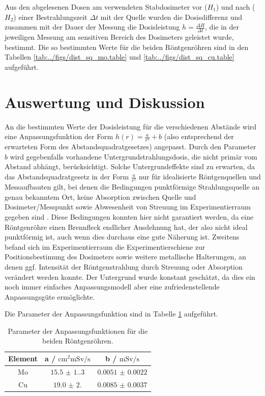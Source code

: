 Aus den abgelesenen Dosen am verwendeten Stabdosimeter vor ($H_1$) und nach ($H_2$) einer Bestrahlungszeit $\Delta t$ mit der Quelle wurden die Dosisdifferenz und zusammen mit der Dauer der Messung die Dosisleistung $h=\frac{\Delta H}{\Delta t}$, die in der jeweiligen Messung am sensitiven Bereich des Dosimeters geleistet wurde, bestimmt. Die so bestimmten Werte für die beiden Röntgenröhren sind in den Tabellen \ref{tab:../figs/dist_sq_mo.table} und \ref{tab:../figs/dist_sq_cu.table} aufgeführt.


\section{Auswertung und Diskussion}

An die bestimmten Werte der Dosisleistung für die verschiedenen Abstände wird eine Anpassungsfunktion der Form $h(r)=\frac{a}{r^2}+b$ (also entsprechend der erwarteten Form des Abstandsquadratgesetzes) angepasst. Durch den Parameter $b$ wird gegebenfalls vorhandene Untergrundstrahlungsdosis, die nicht primär vom Abstand abhängt, berücksichtigt. Solche Untergrundeffekte sind zu erwarten, da das Abstandsquadratgesetz in der Form $\frac{a}{r^2}$ nur für idealisierte Röntgenquellen und Messaufbauten gilt, bei denen die Bedingungen punktförmige Strahlungsquelle an genau bekanntem Ort, keine Absorption zwischen Quelle und Dosimeter/Messpunkt sowie Abwesenheit von Streuung im Experimentierraum gegeben sind \cite[350]{dosimetriekrieger}. Diese Bedingungen konnten hier nicht garantiert werden, da eine Röntgenröhre einen Brennfleck endlicher Ausdehnung hat, der also nicht ideal punktförmig ist, auch wenn dies durchaus eine gute Näherung ist. Zweitens befand sich im Experimentierraum die Experimentierschiene zur Positionsbestimung des Dosimeters sowie weitere metallische Halterungen, an denen ggf. Intensität der Röntgenstrahlung durch Streuung oder Absorption verändert werden konnte. Der Untergrund wurde konstant geschätzt, da dies ein noch immer einfaches Anpassungsmodell aber eine zufriedenstellende Anpassungsgüte ermöglichte.

Die Parameter der Anpassungsfunktion sind in Tabelle \ref{tab:dist_sq_werte} aufgeführt.

\begin{table}[h]
	    \centering
	    \begin{tabular}{|c|c|c|} \hline
		Element & a / $\unit{\centi\meter^2\milli\sievert\per\second}$ & b / $\unit{\milli\sievert\per\s}$ \\ \hline
		Mo & $\num{15.5(1.3)}$ & $\num{0.0051(22)}$ \\
		Cu & $\num{19.0(2.0)}$ & $\num{0.0085(37)}$ \\ \hline
	    \end{tabular}
	    \caption{Parameter der Anpassungsfunktionen für die beiden Röntgenröhren.}
	    \label{tab:dist_sq_werte}
	\end{table}

